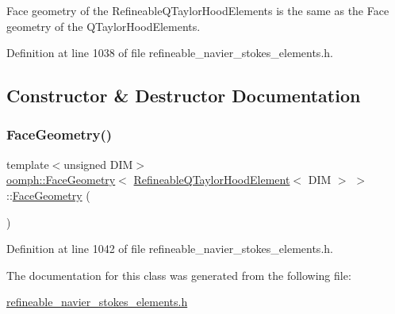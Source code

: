 Face geometry of the Refineable\+Q\+Taylor\+Hood\+Elements is the same as the Face geometry of the Q\+Taylor\+Hood\+Elements. 

Definition at line 1038 of file refineable\+\_\+navier\+\_\+stokes\+\_\+elements.\+h.



\subsection{Constructor \& Destructor Documentation}
\mbox{\label{classoomph_1_1FaceGeometry_3_01RefineableQTaylorHoodElement_3_01DIM_01_4_01_4_ac3a7961b91cbb5729c307ba11151b559}} 
\subsubsection{\texorpdfstring{Face\+Geometry()}{FaceGeometry()}}
{\footnotesize\ttfamily template$<$unsigned D\+IM$>$ \\
\hyperlink{classoomph_1_1FaceGeometry}{oomph\+::\+Face\+Geometry}$<$ \hyperlink{classoomph_1_1RefineableQTaylorHoodElement}{Refineable\+Q\+Taylor\+Hood\+Element}$<$ D\+IM $>$ $>$\+::\hyperlink{classoomph_1_1FaceGeometry}{Face\+Geometry} (\begin{DoxyParamCaption}{ }\end{DoxyParamCaption})\hspace{0.3cm}{\ttfamily [inline]}}



Definition at line 1042 of file refineable\+\_\+navier\+\_\+stokes\+\_\+elements.\+h.



The documentation for this class was generated from the following file\+:\begin{DoxyCompactItemize}
\item 
\hyperlink{refineable__navier__stokes__elements_8h}{refineable\+\_\+navier\+\_\+stokes\+\_\+elements.\+h}\end{DoxyCompactItemize}
